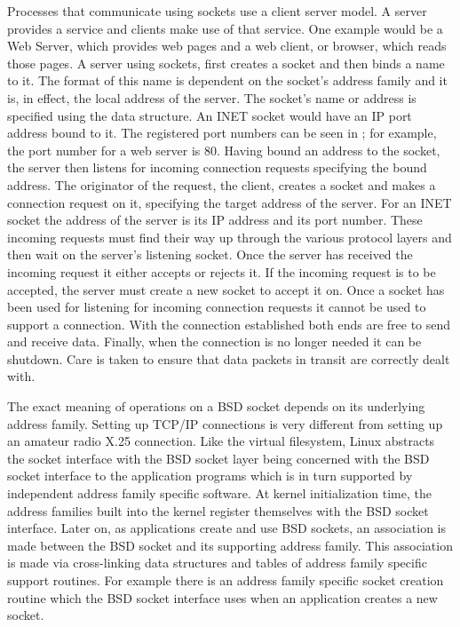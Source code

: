 Processes that communicate using sockets use a client server model.
A server provides a service and clients make use of that service.
One example would be a Web Server, which provides web pages and a web client, or browser, which reads 
those pages.
A server using sockets, first creates a socket and then binds a name to it.
The format of this name is dependent on the socket's address family and it is, in effect, the local
address of the server.
The socket's name or address is specified using the  data structure.
An INET socket would have an IP port address bound to it.
The registered port numbers can be seen in ; for example, the port number for 
a web server is 80.
Having bound an address to the socket, the server then listens for incoming connection requests
specifying the bound address.
The originator of the request, the client, creates a socket and makes a connection request on it,
specifying the target address of the server.
For an INET socket the address of the server is its IP address and its port number.
These incoming requests must find their way up through the various protocol layers and then
wait on the server's listening socket.
Once the server has received the incoming request it either accepts or rejects it.
If the incoming request is to be accepted, the server must create a new socket to accept it 
on.
Once a socket has been used for listening for incoming connection requests it cannot be used
to support a connection.
With the connection established both ends are free to send and receive data.
Finally, when the connection is no longer needed it can be shutdown.
Care is taken to ensure that data packets in transit are correctly dealt with.

The exact meaning of operations on a BSD socket depends on its underlying address family.
Setting up TCP/IP connections is very different from setting up an amateur radio X.25 connection.
Like the virtual filesystem, Linux abstracts the socket interface with the BSD socket layer being 
concerned with the BSD socket interface to the application programs which is in turn supported by 
independent address family specific software.
At kernel initialization time, the address families built into the kernel register themselves with the 
BSD socket interface.
Later on, as applications create and use BSD sockets, an association is made between the BSD
socket and its supporting address family.
This association is made via cross-linking data structures and tables of address family specific
support routines.
For example there is an address family specific socket creation routine which the BSD socket
interface uses when an application creates a new socket.

